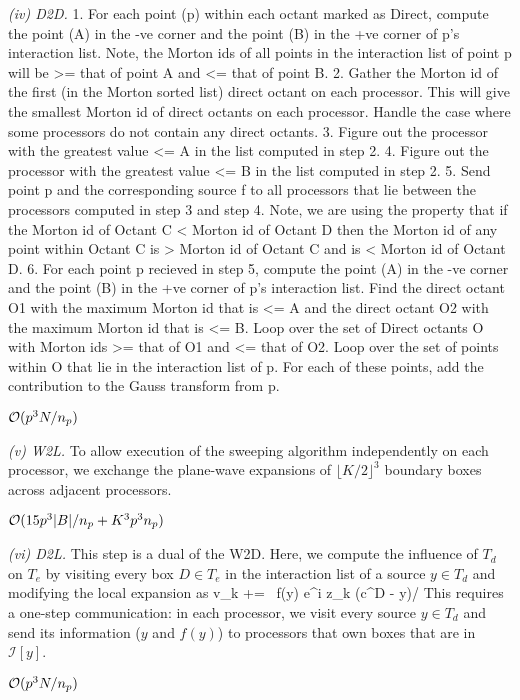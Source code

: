 {\em (iv) D2D.}
1. For each point (p) within each octant marked as Direct, compute the
point (A) in the -ve corner and the point (B) in the +ve corner of p's
interaction list. Note, the Morton ids of all points in the interaction
list of point p will be >= that of point A and <= that of point B.
2. Gather the Morton id of the first (in the Morton sorted list) direct
octant on each processor. This will give the smallest Morton id of
direct octants on each processor. Handle the case where some processors
do not contain any direct octants.
3. Figure out the processor with the greatest value <= A in the list
computed in step 2.
4. Figure out the processor with the greatest value <= B in the list
computed in step 2.
5. Send point p and the corresponding source f to all processors that
lie between the processors computed in step 3 and step 4. Note, we are 
using the property that if the Morton id of Octant C < Morton id of 
Octant D then the Morton id of any point within Octant C is >  Morton
id of Octant C and is < Morton id of Octant D.
6. For each point p recieved in step 5, compute the
point (A) in the -ve corner and the point (B) in the +ve corner of p's
interaction list. Find the direct octant O1 with the maximum Morton id that
is <= A and the direct octant O2 with the maximum Morton id that is <=
B. Loop over the set of Direct octants O with Morton ids >= that of O1
and <= that of O2. Loop over the set of points within O that lie in the
interaction list of p. For each of these points, add the contribution to
the Gauss transform from p.

\hfill $\mathcal{O}(p^3 N/n_p)$

{\em (v) W2L.} To allow execution of the sweeping algorithm independently on each processor, we exchange the plane-wave expansions of $\lfloor K/2 \rfloor ^3$ boundary boxes across adjacent processors. 

\hfill $\mathcal{O}(15 p^3 |B|/n_p + K^3 p^3 n_p)$

{\em (vi) D2L.} This step is a dual of the W2D. Here, we compute the influence of $T_d$ on $T_e$ by visiting every box $D \in T_e$ in the interaction list of a source $y \in T_d$ and modifying the local expansion as 
%
\beq v_k += \, f(y) e^{i z_k \cdot (c^D - y)/\sqrt{\delta}} \eeq
%
This requires a one-step communication: in each processor, we visit every source $y \in T_d$ 
and send its information ($y$ and $f(y)$) to processors that own boxes that are in $\mathcal{I}[y]$.

\hfill $\mathcal{O}(p^3 N / n_p)$

